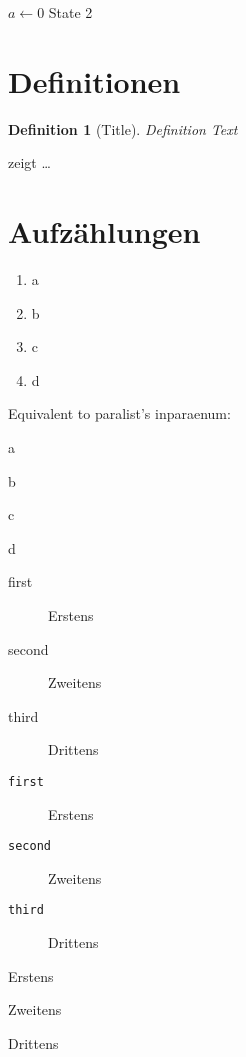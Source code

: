 \documentclass[paper=a5,twoside,fontsize=10pt, DIV=calc, headings=small, bibliography=totoc, listof=totoc]{scrbook}
\theoremstyle{break}
\newtheorem{definition}{Definition}[chapter]
\begin{document}
\begin{algorithm}
\caption{$algo$}
\label{alg:example}
\begin{algorithmic}[1]
\State $a \gets 0$
\State State 2\label{alg1:state2}
\end{algorithmic}
\end{algorithm}

\section{Definitionen}
\begin{definition}[Title]
\label{def:def1}
Definition Text
\end{definition}

 zeigt \ldots


\section{Aufzählungen}
\begin{enumerate}[label=\alph*)]
\item a
\item b
\item c
\item d
\end{enumerate}

Equivalent to paralist's inparaenum:
\begin{enumerate*}[label=\alph*)]
\item a
\item b
\item c
\item d
\end{enumerate*}

\begin{description}
\item[first] Erstens
\item[second] Zweitens
\item[third] Drittens
\end{description}

\begin{description}
\item[\texttt{first}] Erstens
\item[\texttt{second}] Zweitens
\item[\texttt{third}] Drittens
\end{description}

\begin{description}[font=\ttfamily]
\item[first] Erstens
\item[second] Zweitens
\item[third] Drittens
\end{description}
\end{document}
